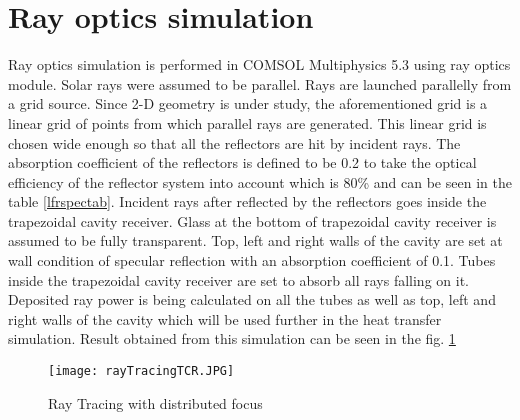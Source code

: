 \section{Ray optics simulation}\label{sec:rayopsim}
Ray optics simulation is performed in COMSOL Multiphysics 5.3 using ray optics module. Solar rays were assumed to be parallel. Rays are launched parallelly from a grid source. Since 2-D geometry is under study, the aforementioned grid is a linear grid of points from which parallel rays are generated. This linear grid is chosen wide enough so that all the reflectors are hit by incident rays. The absorption coefficient of the reflectors is defined to be 0.2 to take the optical efficiency of the reflector system into account which is 80\% and can be seen in the table \ref{lfrspectab}. Incident rays after reflected by the reflectors goes inside the trapezoidal cavity receiver. Glass at the bottom of trapezoidal cavity receiver is assumed to be fully transparent. Top, left and right walls of the cavity are set at wall condition of specular reflection with an absorption coefficient of 0.1. Tubes inside the trapezoidal cavity receiver are set to absorb all rays falling on it. Deposited ray power is being calculated on all the tubes as well as top, left and right walls of the cavity which will be used further in the heat transfer simulation. Result obtained from this simulation can be seen in the fig. \ref{rayTracingTCR}

\begin{figure}[H]
\begin{center}
  \texttt{[image: rayTracingTCR.JPG]}
\caption{Ray Tracing with distributed focus}
\end{center}
\label{rayTracingTCR}
\end{figure}

